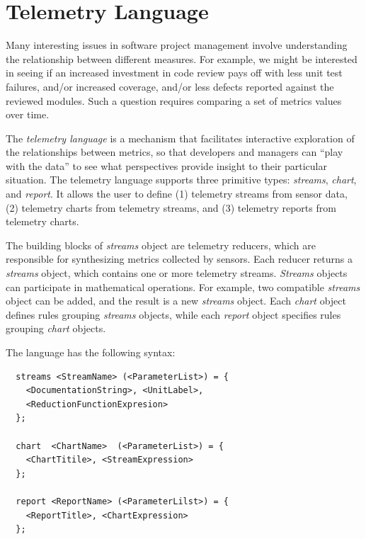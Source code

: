 
\section{Telemetry Language}
\label{Telemetry:Language}

Many interesting issues in software project management involve understanding the relationship between different measures. For example, we might be interested in seeing if an increased investment in code review pays off with less unit test failures, and/or increased coverage, and/or less defects reported against the reviewed modules. Such a question requires comparing a set of metrics values over time. 

The \textit{telemetry language} is a mechanism that facilitates interactive exploration of the relationships between metrics, so that developers and managers can ``play with the data'' to see what perspectives provide insight to their particular situation. The telemetry language supports three primitive types: \textit{streams}, \textit{chart}, and \textit{report}. It allows the user to define (1) telemetry streams from sensor data, (2) telemetry charts from telemetry streams, and (3) telemetry reports from telemetry charts.


The building blocks of \textit{streams} object are telemetry reducers, which are responsible for synthesizing metrics collected by sensors. Each reducer returns a \textit{streams} object, which contains one or more telemetry streams. \textit{Streams} objects can participate in mathematical operations. For example, two compatible \textit{streams} object can be added, and the result is a new \textit{streams} object. Each \textit{chart} object defines rules grouping \textit{streams} objects, while each \textit{report} object specifies rules grouping \textit{chart} objects.

The language has the following syntax:
\begin{verbatim}
  streams <StreamName> (<ParameterList>) = {
    <DocumentationString>, <UnitLabel>, 
    <ReductionFunctionExpresion>
  };
    
  chart  <ChartName>  (<ParameterList>) = {
    <ChartTitile>, <StreamExpression>
  };
    
  report <ReportName> (<ParameterLilst>) = {
    <ReportTitle>, <ChartExpression>
  };
\end{verbatim}

